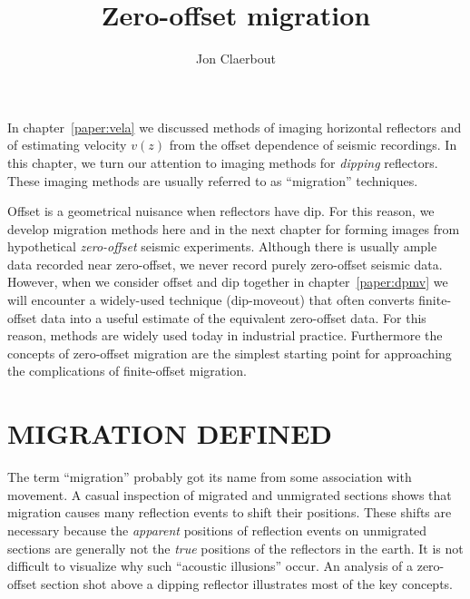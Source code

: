 \def\CAKEDIR{.}

\title{Zero-offset migration}
\author{Jon Claerbout}
\maketitle
\label{paper:krch}


\par
In chapter~\ref{paper:vela} we discussed
methods of imaging horizontal reflectors
and of estimating velocity $v(z)$
from the offset dependence of seismic recordings.
In this chapter,
we turn our attention to imaging methods for {\em dipping} reflectors.
These imaging methods
are usually referred to as ``migration'' techniques.   

\par
Offset is a geometrical nuisance when reflectors have dip.
For this reason,
we develop migration methods here and in the next chapter
for forming images from hypothetical 
{\em zero-offset} seismic experiments.  
Although there is usually ample data recorded near zero-offset,
we never record purely zero-offset seismic data.
However, when we 
consider offset and dip together in chapter~\ref{paper:dpmv} we will encounter
a widely-used technique (dip-moveout) that often 
converts finite-offset data into a useful estimate of the equivalent 
zero-offset data.
For this reason,
methods are widely used today in industrial practice.
Furthermore the concepts of zero-offset migration
are the simplest starting point for approaching
the complications of finite-offset migration.

\section{MIGRATION DEFINED}
\par
The term ``migration'' probably got its name
from some association with movement.
A casual inspection of migrated and unmigrated sections
shows that migration causes many reflection events
to shift their positions.
These shifts are necessary because the {\em apparent} positions
of reflection events on unmigrated sections are generally not the {\em true}
positions of the reflectors in the earth.
It is not difficult to visualize why such ``acoustic illusions'' occur.
An analysis of a zero-offset section
shot above a dipping reflector illustrates most of the key concepts.

